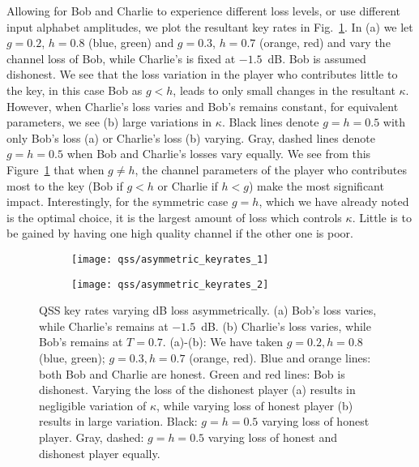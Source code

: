 Allowing for Bob and Charlie to experience different loss levels, or use different input alphabet amplitudes, we plot the resultant key rates in Fig.~\ref{fig:qss_keyrate_asymmetric}. In (a) we let $g=0.2$, $h=0.8$ (blue, green) and $g=0.3$, $h=0.7$ (orange, red) and vary the channel loss of Bob, while Charlie's is fixed at $-1.5$~dB. Bob is assumed dishonest. We see that the loss variation in the player who contributes little to the key, in this case Bob as $g < h$, leads to only small changes in the resultant $\kappa$. However, when Charlie's loss varies and Bob's remains constant, for equivalent parameters, we see (b) large variations in $\kappa$. Black lines denote $g=h=0.5$ with only Bob's loss (a) or Charlie's loss (b) varying. Gray, dashed lines denote $g=h=0.5$ when Bob and Charlie's losses vary equally. We see from this Figure~\ref{fig:qss_keyrate_asymmetric} that when $g \ne h$, the channel parameters of the player who contributes most to the key (Bob if $g < h$ or Charlie if $h < g$) make the most significant impact. Interestingly, for the symmetric case $g=h$, which we have already noted is the optimal choice, it is the largest amount of loss which controls $\kappa$. Little is to be gained by having one high quality channel if the other one is poor. 


\begin{figure}[htp]
\captionsetup{width=\linewidth}
\centering
	\begin{subfigure}{0.7\linewidth}
	\centering
	\texttt{[image: qss/asymmetric\_keyrates\_1]}
	\caption{}
	\end{subfigure}
	\begin{subfigure}{0.7\linewidth}
	\centering
	\texttt{[image: qss/asymmetric\_keyrates\_2]}
	\caption{}
	\end{subfigure}
\caption{\label{fig:qss_keyrate_asymmetric} QSS key rates varying dB loss asymmetrically. (a) Bob's loss varies, while Charlie's remains at $-1.5$~dB. (b) Charlie's loss varies, while Bob's remains at $T=0.7$. (a)-(b): We have taken $g = 0.2, h=0.8$ (blue, green); $g=0.3, h=0.7$ (orange, red). Blue and orange lines: both Bob and Charlie are honest. Green and red lines: Bob is dishonest. Varying the loss of the dishonest player (a) results in negligible variation of $\kappa$, while varying loss of honest player (b) results in large variation. Black: $g=h=0.5$ varying loss of honest player. Gray, dashed: $g=h=0.5$ varying loss of honest and dishonest player equally.}
\end{figure}





